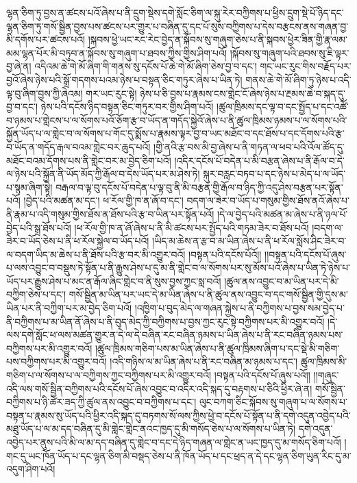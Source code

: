 ལྷན་ཅིག་ཏུ་བྱས་ན་ཚངས་པའོ་ཞེས་པ་ནི་དྲུག་སྡེས་དགེ་སློང་ཅིག་ལ་སྐུ་རེར་བཀྱིགས་པ་ཕྱིས་དྲུག་སྡེ་པོ་ཉིད་དང་ལྷན་ཅིག་ཏུ་གསོ་སྦྱིན་བྱས་པས་ཚངས་པར་གྱུར་པ་བཞིན་དུ་དང་པོ་སུས་བཀྱིགས་པ་དེས་བརྩངས་ནས་གཞན་བྱ་མི་དགོས་པར་ཚངས་པའོ། །སྐབས་ཕྱེ་ཡང་རང་རེང་བྱེད་ན་སྐོབས་སུ་གཞུག་ཅེས་པ་ནི་སྐབས་ཕྱེར་ཟིན་གྱི་རྣ་ལམ་མམ་ལྷན་པོར་མི་བཏུབ་ན་སྐོབས་སུ་གཞུག་པ་ཐབས་ཀྱིས་གྱིས་ཤིག་པའོ། །སྐོབས་སུ་གཞུག་པའི་ཐབས་སུ་ཇི་ལྟར་བྱ་ཞེ་ན། འདིའམ་ཆེ་གེ་མོ་ཞིག་གི་གནས་སུ་དངོས་པོ་ཆེ་གེ་མོ་ཞིག་ཅེས་བྱ་བ་དང་། གང་ཡང་རུང་གིས་བརྗོད་པར་བྱའོ་ཞེས་ཉེས་པའི་སྒྲོ་གདགས་པའམ་ཉེས་པ་བསྟན་ཅིང་གཏུར་ཞེས་པ་ཡིན་ཏེ། གནས་ཆེ་གེ་མོ་ཞིག་ཏུ་ཉེས་པ་འདི་ལྟ་བུ་ཞིག་བྱས་ཀྱི་ཞེའམ། གར་ཡང་རུང་སྟེ། ཉེས་པ་ཅི་བྱས་པ་རྣམས་ངས་གླེང་ངོ་ཞེས་ཉེས་པ་རྔམས་ཆེ་བ་སྐད་དུ་བྱ་བ་དང་། ཉེས་པའི་དངོས་ཉིད་བསྟན་ཅིང་གཏུར་བར་གྱིས་ཤིག་པའོ། །ཚུལ་ཁྲིམས་དང་ལྟ་བ་དང་སྤྱོད་པ་དང་འཚོ་བ་ཉམས་པ་གླེངས་པ་ལ་སོགས་པའོ་ཅོག་རྩ་བ་ཡོད་ན་གདོད་སྐྱེའོ་ཞེས་པ་ནི་ཚུལ་ཁྲིམས་ཉམས་པ་ལ་སོགས་པའི་སྐྱོན་ཡོད་པ་ལ་གླེང་བ་ལ་སོགས་པ་གོང་དུ་སྨོས་པ་རྣམས་ལྟར་བྱ་བ་ཡང་མཐོང་བ་དང་ཐོས་པ་དང་དོགས་པའི་རྩ་བ་ཡོད་ན་གདོད་རྒལ་བའམ་གླེང་བར་ཆུད་པའོ། །གྱི་ནའི་རྩ་བས་མི་བྱ་ཞེས་པ་ནི་གཏན་ལ་ཕབ་པའི་འོལ་ཚོད་དུ་མཐོང་བའམ་དོགས་པས་ནི་གླེང་བར་མ་བྱེད་ཅིག་པའོ། །འདིར་དངོས་པོ་བདེན་པ་མི་བརྩན་ཞེས་པ་ནི་རྒོལ་བ་དེ་ལ་ཉེས་པའི་སྐྱོན་ནི་ཡོད་མོད་ཀྱི་རྒོལ་བ་དེས་ཡོད་པར་མ་ཤེས་ཏེ། སྐུར་བརླང་བཏབ་པ་དང་ཉེས་པ་མེད་པ་ལ་ཡོད་པ་སྙམ་ཞིག་སྟེ། བརྒལ་བ་ལྟ་བུ་དངོས་པོ་བདེན་པ་ལྟ་བུ་ནི་མི་བརྩན་གྱི་རྒོལ་བ་ཉིད་ཀྱི་འདུ་ཤེས་བརྩན་པར་སྟོན་པའོ། །བྱེད་པའི་མཚན་མ་དང་། ཕ་རོལ་གྱི་ཁ་ན་ཞོ་བ་དང་། བདག་ལ་ཟེར་བ་ཡོད་པ་གསུམ་གྱིས་ཐོས་ནའོ་ཞེས་པ་ནི་རྣམ་པ་འདི་གསུམ་གྱིས་ཐོས་ན་ཐོས་པའི་རྩ་བ་ཡིན་པར་སྟོན་པའོ། །དེ་ལ་བྱེད་པའི་མཚན་མ་ཞེས་པ་ནི་ཉལ་པོ་བྱེད་པའི་སྒྲ་ཐོས་པའོ། །ཕ་རོལ་གྱི་ཁ་ན་ཞོ་ཞེས་པ་ནི་མི་ཚངས་པར་སྤྱོད་པའི་གཏམ་ཟེར་བ་ཐོས་པའོ། །བདག་ལ་ཟེར་བ་ཡོད་ཅེས་པ་ནི་ཕ་རོལ་སྐྱེལ་བ་ཡོད་པའོ། །ཡིད་མ་ཆེས་ན་རྩ་བ་མ་ཡིན་ཞེས་པ་ནི་ཕ་རོལ་སློས་ཤིང་ཟེར་བ་ལ་བདག་ཡིད་མ་ཆེས་པ་ནི་ཐོས་པའི་རྩ་བར་མི་འགྱུར་བའོ། །བསྟན་པའི་དངོས་པོའོ།། །།བསྟན་པའི་དངོས་པོ་ཞུས་པ་ལས་འབྱུང་བ་བསྡུས་ཏེ་སྟོན་པ་ནི་རྒྱུས་ཤེས་པ་དུ་མ་ནི་གླེང་བ་ལ་སོགས་པར་སུ་མོས་པའོ་ཞེས་པ་ཡིན་ཏེ་ཉེས་པ་ཡོད་པར་རྒྱུས་ཤེས་པ་མང་ན་རྒོལ་ཞིང་གླེང་བ་ནི་སུས་བྱས་ཀྱང་སླ་བའོ། །ཚུལ་ནས་འབྱུང་བ་མ་ཡིན་པར་དེ་མི་བཀྱིག་ཅེས་པ་དང་། གསོ་སྦྱིན་མ་ཡིན་པར་ཡང་དེ་མ་ཡིན་ཞེས་པ་ནི་ཚུལ་ནས་འབྱུང་བ་དང་གསོ་སྦྱིན་གྱི་དུས་མ་ཡིན་པར་ནི་བཀྱིག་པར་མ་བྱེད་ཅིག་པའོ། །འཁྱིག་པ་བུད་མེད་ལ་གཞན་སྐྱེས་པ་ནི་བཀྱིགས་པ་བྱས་སམ་བྱེད་པ་ནི་བཀྱིགས་པ་མ་ཡིན་ནོ་ཞེས་པ་ནི་བུད་མེད་ཀྱི་བཀྱིགས་པ་བྱས་ཀྱང་རུང་སྟེ་བཀྱིགས་པར་མི་འགྱུར་བའོ། །དེ་ལས་དགེ་སློང་ཕ་ལས་མཚན་གྱུར་ན་དེ་ལ་དེ་བཞིན་རང་བཞིན་ཉམས་པ་ཡིན་ཞེས་པ་ནི་རང་བཞིན་ཉམས་པས་བཀྱིགས་པར་མི་འགྱུར་བའོ། །ཚུལ་ཁྲིམས་གཅིག་པས་མ་ཡིན་ཞེས་པ་ནི་ཚུལ་ཁྲིམས་ཞིག་པ་དང་སྡེ་མི་གཅིག་པས་བཀྱིགས་པར་མི་འགྱུར་བའོ། །འདི་གཉིས་ལ་མ་ཡིན་ཞེས་པ་ནི་རང་བཞིན་མ་ཉམས་པ་དང་། ཚུལ་ཁྲིམས་མི་གཅིག་པ་ལ་སོགས་པ་ལ་བཀྱིགས་ཀྱང་བཀྱིགས་པར་མི་འགྱུར་བའོ། །བསྟན་པའི་དངོས་པོ་ཞུས་པའོ།། །།གཞུང་འདི་ལས་གསོ་སྦྱིན་བཀྱིགས་པའི་དངོས་པོ་ཞེས་འབྱུང་བ་འདིར་འདི་སྐད་དུ་བརྟགས་པ་ཅིའི་ཕྱིར་ཞེ་ན། གསོ་སྦྱིན་བཀྱིགས་པ་ཉི་ཚེར་ཟད་ཀྱི་ཚུལ་ནས་འབྱུང་བ་བཀྱིགས་པ་དང་། ལུང་བཀག་ཅིང་སྐོབས་སུ་གཞུག་པ་ལ་སོགས་པ་བསྟན་པ་རྣམས་སུ་ཡོད་པའི་ཕྱིར་འདི་སྐད་དུ་བཏགས་སོ་ལས་ཀྱིས་ཕྱེ་བ་དངོས་པོ་སྟོན་པ་ནི་དགེ་འདུན་འབྱེད་པའི་མཐུ་ཡོད་པ་ལ་མ་དད་བཞིན་དུ་མི་གླེང་གླེང་ནའང་ཁྱད་དུ་མི་གསོད་ཅེས་པ་ལ་སོགས་པ་ཡིན་ཏེ། དགེ་འདུན་འབྱེད་པར་ནུས་པའི་མི་ལ་མ་དད་བཞིན་དུ་གླེང་བ་དང་དེ་ཉིད་གཞན་ལ་གླེང་ན་ཡང་ཁྱད་དུ་མ་གསོད་ཅིག་པའོ། །གང་དུ་ཡང་ཁོན་ཡོད་པ་དང་ལྷན་ཅིག་མི་བསྡད་ཅེས་པ་ནི་ཁོན་ཡོད་པ་དང་ཕྲད་ན་དེ་དང་ལྷན་ཅིག་ཡུན་རིང་དུ་མ་འདུག་ཤིག་པའོ། 